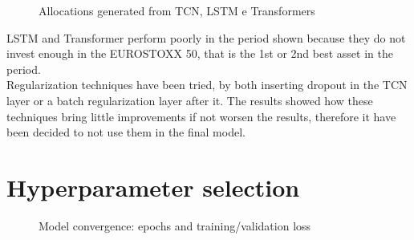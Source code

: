 \begin{figure}[h]
	\caption{Allocations generated from TCN, LSTM e Transformers}%
	\label{fig:allocation_comparison_architecture}%
\end{figure}

LSTM and Transformer perform poorly in the period shown because they do not invest enough in the EUROSTOXX 50, that is the 1st or 2nd best asset in the period. \\


Regularization techniques have been tried, by both inserting dropout in the TCN layer or a batch regularization layer after it. The results showed how these techniques bring little improvements if not worsen the results, therefore it have been decided to not use them in the final model.

\section{Hyperparameter selection}

\begin{figure}[H]
	\centering
	\caption{Model convergence: epochs and training/validation loss}%
	\label{fig:epochs_loss}%
\end{figure}

